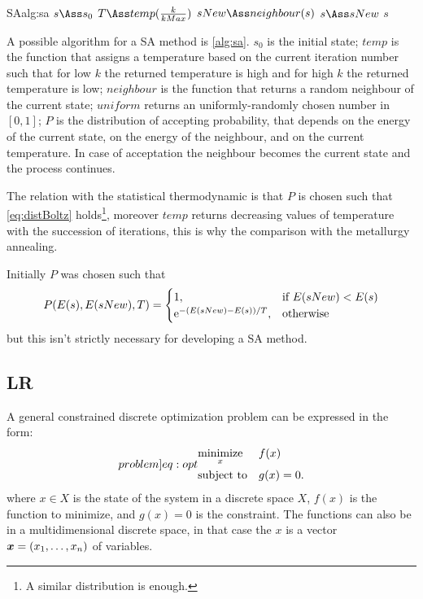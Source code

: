 \documentclass[dissertation.tex]{subfiles}
\begin{document}
\begin{algo}{\acf{SA}}{alg:sa}
  \State $s\Ass s_0$
  \State $T\Ass temp(\frac{k}{kMax})$
  \State $sNew\Ass neighbour(s)$
  \State $s\Ass sNew$
  \EndIf
  \EndFor
  \State\Return $s$
  \EndFunction
\end{algo}
A possible algorithm for a \ac{SA} method is \cref{alg:sa}. $s_0$ is
the initial state; $temp$ is the function that assigns a
temperature based on the current iteration number such that for low
$k$ the returned temperature is high and for high $k$ the returned temperature
is low; $neighbour$ is the function that returns a random neighbour of
the current state; $uniform$ returns an uniformly-randomly chosen
number in $[0,1]$; $P$ is the distribution of accepting probability,
that depends on the energy of the current state, on the energy of the
neighbour, and on the current temperature. In case of acceptation the
neighbour becomes the current state and the process continues.

The relation with the statistical thermodynamic is that $P$ is chosen
such that
\cref{eq:distBoltz} holds\footnote{A similar distribution is enough.},
moreover $temp$ returns decreasing values of
temperature with the succession of iterations, this is why the
comparison with the metallurgy annealing.

Initially $P$ was chosen such that
\begin{equation*}
  P(E(s), E(sNew), T)=
  \begin{cases}
    1,& \text{if }E(sNew)<E(s)\\
    \mathrm{e}^{-(E(sNew)-E(s))/T},& \text{otherwise}
  \end{cases}
\end{equation*}
but this isn't strictly necessary for developing a \ac{SA} method.

\subsection{\acf{LR}}\label{sec:lagrangianRelaxation}
A general constrained discrete optimization problem can be expressed in
the form:
\begin{equation}\label[problem]{eq:opt}
\begin{aligned}
& \underset{x}{\text{minimize}}
& & f(x) \\
& \text{subject to}
& & g(x)=0.
\end{aligned}
\end{equation}
where $x\in X$ is the state of the system in a discrete space $X$, $f(x)$
is the function to
minimize, and $g(x)=0$ is the constraint. The functions can also be
in a multidimensional discrete space, in that case the $x$ is a vector
$\boldsymbol{x}=(x_1,\dots,x_n)$ of variables.
\end{document}
